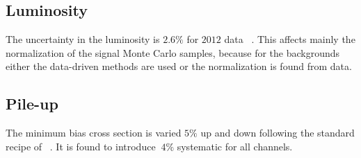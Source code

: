 
\subsection{Luminosity}                                                                                                                                                           
The uncertainty in the luminosity  is $2.6\%$ for $2012$ data ~\cite{LUMI}.                                                                                                       
This affects mainly the  normalization of the signal Monte Carlo samples, because for the backgrounds  either  the data-driven methods are used or
the normalization is found from data.

\subsection{Pile-up}
The minimum bias cross section is varied $5 \%$ up and down following the standard recipe of ~\cite{PU_SYS}. It is found to introduce $~4 \%$ systematic for all channels.    

